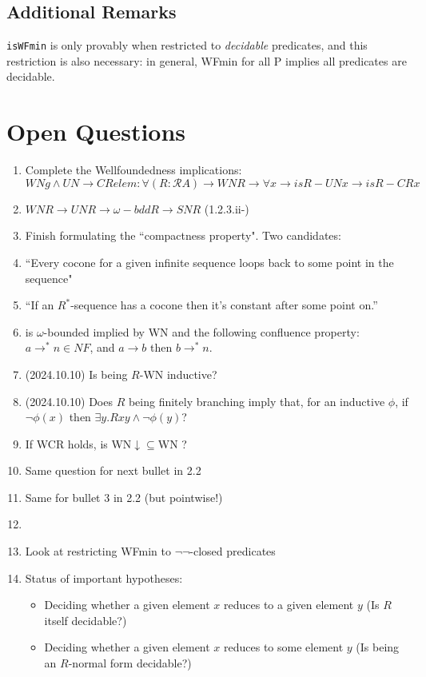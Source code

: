 \documentclass{scrartcl}
\begin{document}
\subsection{Additional Remarks}

\texttt{isWFmin} is only provably when restricted to \emph{decidable} predicates, and this
restriction is also necessary: in general, WFmin for all P implies all predicates are decidable.

  \section{Open Questions }
  \begin{enumerate}
    \item Complete the Wellfoundedness implications:
       \[ WNg \land UN \to CRelem :
       \forall (R : \mathscr{R} A) \to WN R \to \forall x \to is R -UN x \to is R -CR x \]
       \item $WN R \to UN R \to \omega-bdd R \to SN R$ (1.2.3.ii-)
        \item Finish formulating the ``compactness property".  Two candidates:
         \item ``Every cocone for a given infinite sequence loops back to some point in the sequence"
         \item ``If an $R^*$-sequence has a cocone then it's constant after some point on.''
         \item is $\omega$-bounded implied by WN and the following confluence property:
         $a \to^* n \in NF$, and $a \to b$ then $b \to^* n $.
    \item (2024.10.10) Is being $R$-WN inductive?
    \item (2024.10.10) Does $R$ being finitely branching imply
     that, for an inductive $\phi$, if $\lnot \phi(x)$ then
     $\exists y. Rxy \land \lnot \phi(y)$?

    \item If WCR holds, is WN$\downarrow\subseteq$WN ?
    \item Same question for next bullet in 2.2
    \item Same for bullet 3 in 2.2 (but pointwise!)
    \item \item Look at restricting WFmin to $\lnot\lnot$-closed predicates
    \item Status of important hypotheses:
      \begin{itemize}
        \item Deciding whether a given element $x$ reduces to a given element $y$
        (Is $R$ itself decidable?)
        \item Deciding whether a given element $x$ reduces to some element $y$
        (Is being an $R$-normal form decidable?)


\end{itemize}
\end{enumerate}
\end{document}
